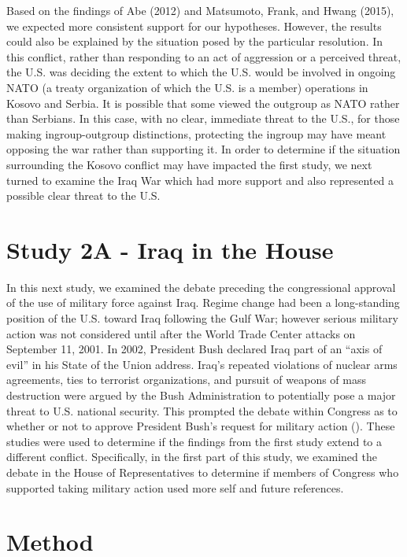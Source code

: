 \documentclass[jou,a4paper]{apa6}
\begin{document}
Based on the findings of Abe (2012) and Matsumoto, Frank, and Hwang (2015), we expected more consistent support for our hypotheses. However, the results could also be explained by the situation posed by the particular resolution. In this conflict, rather than responding to an act of aggression or a perceived threat, the U.S. was deciding the extent to which the U.S. would be involved in ongoing NATO (a treaty organization of which the U.S. is a member) operations in Kosovo and Serbia. It is possible that some viewed the outgroup as NATO rather than Serbians. In this case, with no clear, immediate threat to the U.S., for those making ingroup-outgroup distinctions, protecting the ingroup may have meant opposing the war rather than supporting it. In order to determine if the situation surrounding the Kosovo conflict may have impacted the first study, we next turned to examine the Iraq War which had more support and also represented a possible clear threat to the U.S.

\section{Study 2A - Iraq in the House}

In this next study, we examined the debate preceding the congressional approval of the use of military force against Iraq. Regime change had been a long-standing position of the U.S. toward Iraq following the Gulf War; however serious military action was not considered until after the World Trade Center attacks on September 11, 2001. In 2002, President Bush declared Iraq part of an \enquote{axis of evil} in his State of the Union address. Iraq's repeated violations of nuclear arms agreements, ties to terrorist organizations, and pursuit of weapons of mass destruction were argued by the Bush Administration to potentially pose a major threat to U.S. national security. This prompted the debate within Congress as to whether or not to approve President Bush's request for military action (\cite{Katzman2002}). These studies were used to determine if the findings from the first study extend to a different conflict. Specifically, in the first part of this study, we examined the debate in the House of Representatives to determine if members of Congress who supported taking military action used more self and future references.

\section{Method}
\end{document}
